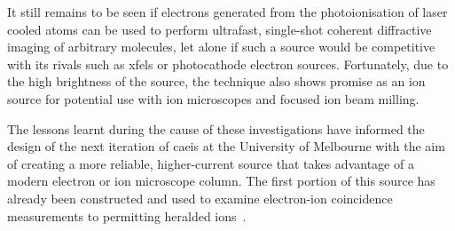 It still remains to be seen if electrons generated from the photoionisation of laser cooled atoms can be used to perform ultrafast, single-shot coherent diffractive imaging of arbitrary molecules, let alone if such a source would be competitive with its rivals such as \glspl{xfel} or photocathode electron sources.
Fortunately, due to the high brightness of the source, the technique also shows promise as an ion source for potential use with ion microscopes and focused ion beam milling.

The lessons learnt during the cause of these investigations have informed the design of the next iteration of \gls{caeis} at the University of Melbourne with the aim of creating a more reliable, higher-current source that takes advantage of a modern electron or ion microscope column.
The first portion of this source has already been constructed and used to examine electron-ion coincidence measurements to permitting heralded ions~\cite{mcculloch_heralded_2018}.